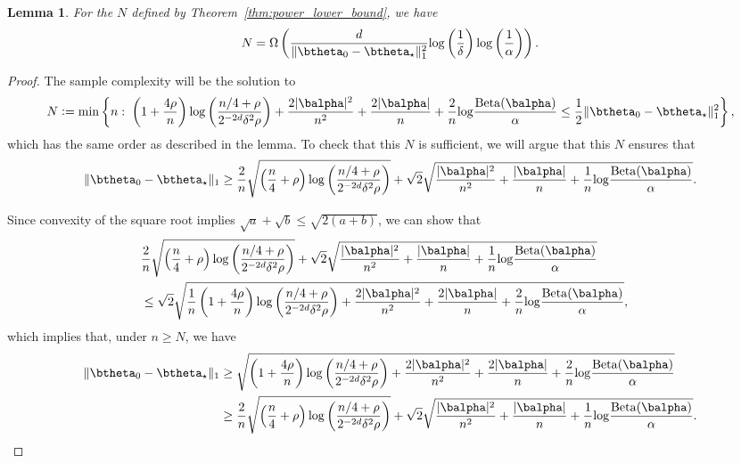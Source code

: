 \documentclass[11pt]{article}
\def\log{{\rm log}}
\newcommand{\Beta}{\mathrm{Beta}}
\newtheorem{lemma}{Lemma}[section]
\newcommand{\df}{\vcentcolon=}
\newcommand{\pfrac}[2]{\left(\frac{#1}{#2}\right)}
\begin{document}
\begin{lemma}
  For the $N$ defined by Theorem~\ref{thm:power_lower_bound}, we have
  \begin{equation*}
    N = \Omega\left(
      \frac{d}{\Vert \btheta_0- \btheta_\star\Vert_{1}^2}
\log\pfrac{1}{\delta}\log\pfrac{1}{\alpha}
    \right).
  \end{equation*}
\end{lemma}
\begin{proof}
The sample complexity will be the solution to
\[
  N \df
  \min
  \left\{
    n:\;
      \left(1 + \frac{4\rho}{n}\right)
      \log\pfrac{n/4+\rho}{2^{-2d}\delta^2 \rho}
    +
      \frac{2|\balpha|^2}{n^2} + \frac{2|\balpha|}{n}
      +
    \frac{2}{n}\log\frac{\Beta(\balpha)}{\alpha}
    \leq
    \frac{1}{2}\Vert \btheta_0- \btheta_\star\Vert_{1}^2
  \right\},
\]
  which has the same order as described in the lemma. To check that this $N$ is sufficient, we will argue that this $N$ ensures that
  \begin{equation}\label{eqn:n.bound}
    \Vert \btheta_0- \btheta_\star\Vert_{1}
    \geq
    \frac{2}{n}\sqrt{\left(\frac{n}{4} + \rho\right)
      \log\pfrac{n/4+\rho}{2^{-2d}\delta^2 \rho}}
    + \sqrt{2}\sqrt{
      \frac{|\balpha|^2}{n^2} + \frac{|\balpha|}{n}
      +
      \frac{1}{n}\log\frac{\Beta(\balpha)}{\alpha}
    }.
\end{equation}  

Since convexity of the square root implies  $\sqrt{a}+\sqrt{b}\leq\sqrt{2(a+b)}$, we can show that
\begin{align*}
    \lefteqn{\frac{2}{n}\sqrt{\left(\frac{n}{4} + \rho\right)
      \log\pfrac{n/4+\rho}{2^{-2d}\delta^2 \rho}}
    + \sqrt{2}\sqrt{
      \frac{|\balpha|^2}{n^2} + \frac{|\balpha|}{n}
      +
      \frac{1}{n}\log\frac{\Beta(\balpha)}{\alpha}
  }}\\
  &\leq
    \sqrt{2}
      \sqrt{\frac{1}{n}\left(1 + \frac{4\rho}{n}\right)
      \log\pfrac{n/4+\rho}{2^{-2d}\delta^2 \rho}
    +
      \frac{2|\balpha|^2}{n^2} + \frac{2|\balpha|}{n}
      +
    \frac{2}{n}\log\frac{\Beta(\balpha)}{\alpha}
    },
\end{align*}
which implies that, under $n \geq N$, we have
\begin{align*}
    \Vert \btheta_0- \btheta_\star\Vert_{1}
  &\geq
    \sqrt{
    \left(1 + \frac{4\rho}{n}\right)
      \log\pfrac{n/4+\rho}{2^{-2d}\delta^2 \rho}
    +
      \frac{2|\balpha|^2}{n^2} + \frac{2|\balpha|}{n}
      +
    \frac{2}{n}\log\frac{\Beta(\balpha)}{\alpha}
    }\\
    &\geq
      \frac{2}{n}\sqrt{\left(\frac{n}{4} + \rho\right)
      \log\pfrac{n/4+\rho}{2^{-2d}\delta^2 \rho}}
    + \sqrt{2}\sqrt{
      \frac{|\balpha|^2}{n^2} + \frac{|\balpha|}{n}
      +
      \frac{1}{n}\log\frac{\Beta(\balpha)}{\alpha}
      }.
\end{align*}
\end{proof}
\end{document}
